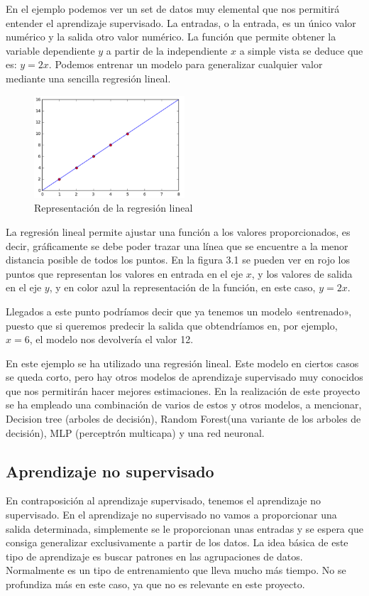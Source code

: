 En el ejemplo podemos ver un set de datos muy elemental que nos permitirá entender el aprendizaje supervisado. La entradas, o la entrada, es un único valor numérico y la salida otro valor numérico. La función que permite obtener la variable dependiente $y$ a partir de la independiente $x$ a simple vista se deduce que es: $y = 2x$. Podemos entrenar un modelo para generalizar cualquier valor mediante una sencilla regresión lineal.

\begin{figure}[h]
  \centering
    \includegraphics[width=0.5\textwidth]{../img/supervisado_grafica_1}
  \caption{Representación de la regresión lineal}
  \label{regresion_lineal}
\end{figure}

La regresión lineal permite ajustar una función a los valores proporcionados, es decir, gráficamente se debe poder trazar una línea que se encuentre a la menor distancia posible de todos los puntos. En la figura 3.1 se pueden ver en rojo los puntos que representan los valores en entrada en el eje $x$, y los valores de salida en el eje $y$, y en color azul la representación de la función, en este caso, $y = 2x$.

Llegados a este punto podríamos decir que ya tenemos un modelo «entrenado», puesto que si queremos predecir la salida que obtendríamos en, por ejemplo, $x=6$, el modelo nos devolvería el valor 12.

En este ejemplo se ha utilizado una regresión lineal. Este modelo en ciertos casos se queda corto, pero hay otros modelos de aprendizaje supervisado muy conocidos que nos permitirán hacer mejores estimaciones. En la realización de este proyecto se ha empleado una combinación de varios de estos y otros modelos, a mencionar, Decision tree (arboles de decisión), Random Forest(una variante de los arboles de decisión), MLP (perceptrón multicapa) y una red neuronal.

\subsection{Aprendizaje no supervisado}
En contraposición al aprendizaje supervisado, tenemos el aprendizaje no supervisado. En el aprendizaje no supervisado no vamos a proporcionar una salida determinada, simplemente se le proporcionan unas entradas y se espera que consiga generalizar exclusivamente a partir de los datos. La idea básica de este tipo de aprendizaje es buscar patrones en las agrupaciones de datos. Normalmente es un tipo de entrenamiento que lleva mucho más tiempo. No se profundiza más en este caso, ya que no es relevante en este proyecto.

